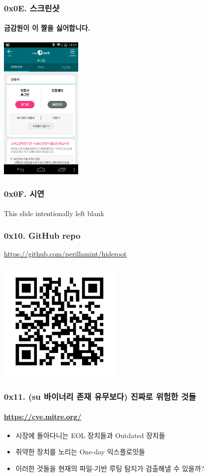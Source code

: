 \begin{frame}
  \frametitle{0x0E. 스크린샷}
  \framesubtitle{금감원이 이 짤을 싫어합니다.}

  \begin{center}
    \includegraphics [width=40mm]{img/Hana1QrootBypass.png}
  \end{center}
\end{frame}

\begin{frame}
  \frametitle{0x0F. 시연}
  \framesubtitle{}

  \begin{center}
  This slide intentionally left blank
  \end{center}
\end{frame}

\begin{frame}
  \frametitle{0x10. GitHub repo}

  \url{https://github.com/perillamint/hideroot}\newline
  \begin{center}
    \includegraphics [width=60mm]{img/ghrepo_qr.png}
  \end{center}
\end{frame}

\begin{frame}
  \frametitle{0x11. (su 바이너리 존재 유무보다) 진짜로 위험한 것들}
  \framesubtitle{\url{https://cve.mitre.org/}}

  \begin{itemize}
  \item <1-> 시장에 돌아다니는 EOL 장치들과 Outdated 장치들
  \item <2-> 취약한 장치를 노리는 One-day 익스플로잇들\cite{godless}
  \item <3-> 이러한 것들을 현재의 파일-기반 루팅 탐지가 검출해낼 수 있을까?
  \end{itemize}
\end{frame}

